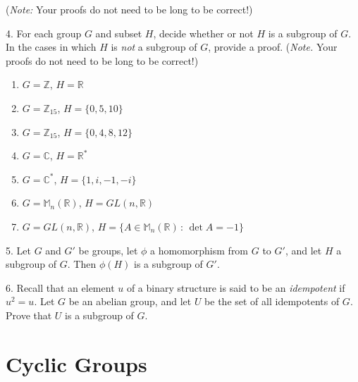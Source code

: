 \documentclass[10pt,openany,oneside]{book}
\theoremstyle{plain}
\theoremstyle{definition}
\theoremstyle{definition}
\theoremstyle{definition}
\theoremstyle{definition}
\numberwithin{equation}{section}
\def\Z{\mathbb{Z}}
\def\R{\mathbb{R}}
\def\C{\mathbb{C}}
\def\M{\mathbb{M}}
\begin{document}
\begin{exerciselist}
\begin{enumerate}[label=(\alph*)]
\end{enumerate}
%
\par
(\emph{Note:} Your proofs do not need to be long to be correct!)%
\par\smallskip
\item[4.]\hypertarget{exercise-31}{}For each group \(G\) and subset \(H\), decide whether or not \(H\) is a subgroup of \(G\). In the cases in which \(H\) is \emph{not} a subgroup of \(G\), provide a proof. (\emph{Note.} Your proofs do not need to be long to be correct!) \leavevmode%
\begin{enumerate}[label=(\alph*)]
\item\hypertarget{li-233}{}\(G=\Z\), \(H=\R\)%
\item\hypertarget{li-234}{}\(G=\Z_{15}\), \(H=\{0,5,10\}\)%
\item\hypertarget{li-235}{}\(G=\Z_{15}\), \(H=\{0,4,8,12\}\)%
\item\hypertarget{li-236}{}\(G=\C\), \(H=\R^*\)%
\item\hypertarget{li-237}{}\(G=\C^*\), \(H=\{1,i,-1,-i\}\)%
\item\hypertarget{li-238}{}\(G=\M_n(\R)\), \(H=GL(n,\R)\)%
\item\hypertarget{li-239}{}\(G=GL(n,\R)\), \(H=\{A\in \M_n(\R)\,:\,\det A = -1\}\)%
\end{enumerate}
%
\par\smallskip
\item[5.]\hypertarget{exercise-32}{}Let \(G\) and \(G'\) be groups, let \(\phi\) a homomorphism from \(G\) to \(G'\), and let \(H\) a subgroup of \(G\). Then \(\phi(H)\) is a subgroup of \(G'\).%
\par\smallskip
\item[6.]\hypertarget{exercise-33}{}Recall that an element \(u\) of a binary structure is said to be an \emph{idempotent} if \(u^2=u\). Let \(G\) be an abelian group, and let \(U\) be the set of all idempotents of \(G\). Prove that \(U\) is a subgroup of \(G\).%
\par\smallskip
\end{exerciselist}
\typeout{************************************************}
\typeout{************************************************}
\chapter[{Cyclic Groups}]{Cyclic Groups}\label{cyc}
\typeout{************************************************}
\typeout{************************************************}
\end{document}
